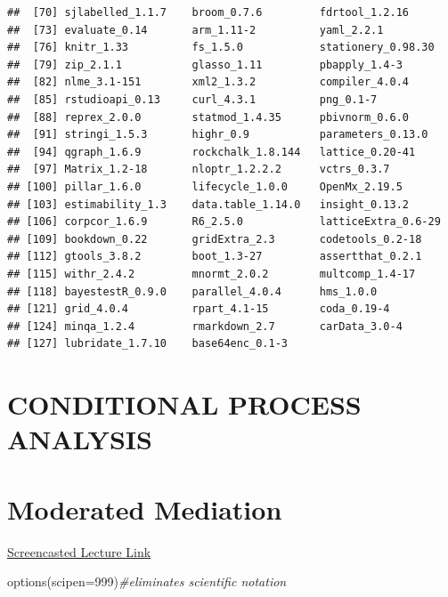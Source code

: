 \documentclass[
  english,
]{book}
\newenvironment{Shaded}{\begin{snugshade}}{\end{snugshade}}
\newcommand{\AttributeTok}[1]{\textcolor[rgb]{0.77,0.63,0.00}{#1}}
\newcommand{\CommentTok}[1]{\textcolor[rgb]{0.56,0.35,0.01}{\textit{#1}}}
\newcommand{\DecValTok}[1]{\textcolor[rgb]{0.00,0.00,0.81}{#1}}
\newcommand{\FunctionTok}[1]{\textcolor[rgb]{0.00,0.00,0.00}{#1}}
\newcommand{\NormalTok}[1]{#1}
\begin{document}
\begin{verbatim}
##  [70] sjlabelled_1.1.7    broom_0.7.6         fdrtool_1.2.16     
##  [73] evaluate_0.14       arm_1.11-2          yaml_2.2.1         
##  [76] knitr_1.33          fs_1.5.0            stationery_0.98.30 
##  [79] zip_2.1.1           glasso_1.11         pbapply_1.4-3      
##  [82] nlme_3.1-151        xml2_1.3.2          compiler_4.0.4     
##  [85] rstudioapi_0.13     curl_4.3.1          png_0.1-7          
##  [88] reprex_2.0.0        statmod_1.4.35      pbivnorm_0.6.0     
##  [91] stringi_1.5.3       highr_0.9           parameters_0.13.0  
##  [94] qgraph_1.6.9        rockchalk_1.8.144   lattice_0.20-41    
##  [97] Matrix_1.2-18       nloptr_1.2.2.2      vctrs_0.3.7        
## [100] pillar_1.6.0        lifecycle_1.0.0     OpenMx_2.19.5      
## [103] estimability_1.3    data.table_1.14.0   insight_0.13.2     
## [106] corpcor_1.6.9       R6_2.5.0            latticeExtra_0.6-29
## [109] bookdown_0.22       gridExtra_2.3       codetools_0.2-18   
## [112] gtools_3.8.2        boot_1.3-27         assertthat_0.2.1   
## [115] withr_2.4.2         mnormt_2.0.2        multcomp_1.4-17    
## [118] bayestestR_0.9.0    parallel_4.0.4      hms_1.0.0          
## [121] grid_4.0.4          rpart_4.1-15        coda_0.19-4        
## [124] minqa_1.2.4         rmarkdown_2.7       carData_3.0-4      
## [127] lubridate_1.7.10    base64enc_0.1-3
\end{verbatim}

\hypertarget{CPAnal}{%
\chapter*{CONDITIONAL PROCESS ANALYSIS}\label{CPAnal}}

\hypertarget{ModMed}{%
\chapter{Moderated Mediation}\label{ModMed}}

\href{https://spu.hosted.panopto.com/Panopto/Pages/Viewer.aspx?pid=1d28d076-efad-4471-b52d-ad1601826f92}{Screencasted Lecture Link}

\begin{Shaded}
\begin{Highlighting}[]
\FunctionTok{options}\NormalTok{(}\AttributeTok{scipen=}\DecValTok{999}\NormalTok{)}\CommentTok{\#eliminates scientific notation}
\end{Highlighting}
\end{Shaded}
\end{document}
